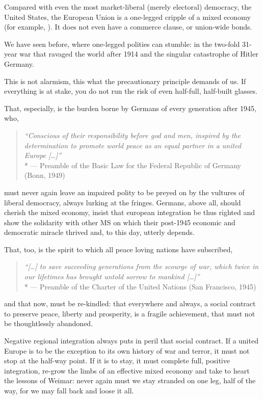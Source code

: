 Compared with even the most market-liberal (merely electoral) democracy, the United States, the European Union is a one-legged cripple of a mixed economy (for example, \citealt{Bordo2011}).
It does not even have a commerce clause, or union-wide bonds.

We have seen before, where one-legged polities can stumble:
in the two-fold 31-year war that ravaged the world after 1914 and the singular catastrophe of Hitler Germany.

This is not alarmism, this what the precautionary principle demands of us.
If everything is at stake, you do not run the risk of even half-full, half-built glasses.

That, especially, is the burden borne by Germans of every generation after 1945, who,
\begin{quote}
	\emph{``Conscious of their responsibility before god and men, inspired by the determination to promote world peace as an equal partner in a united Europe [\ldots]''}
	\\*
	--- Preamble of the Basic Law for the Federal Republic of Germany (Bonn, 1949)
\end{quote}
must never again leave an impaired polity to be preyed on by the vultures of liberal democracy, always lurking at the fringes.
Germans, above all, should cherish the mixed economy, insist that european integration be thus righted and show the solidarity with other \gls{MS} on which their post-1945 economic and democratic miracle thrived and, to this day, utterly depends.

That, too, is the spirit to which all peace loving nations have subscribed,
\begin{quote}
	\emph{``[\ldots] to save succeeding generations from the scourge of war, which twice in our lifetimes has brought untold sorrow to mankind [\ldots]''}
	\\*
	--- Preamble of the Charter of the United Nations (San Francisco, 1945)
\end{quote}
and that now, must be re-kindled:
that everywhere and always, a social contract to preserve peace, liberty and prosperity, is a fragile achievement, that must not be thoughtlessly abandoned.

Negative regional integration always puts in peril that social contract.
If a united Europe is to be the exception to its own history of war and terror, it must not stop at the half-way point.
If it is to stay, it must complete full, positive integration, re-grow the limbs of an effective mixed economy and take to heart the lessons of Weimar:
never again must we stay stranded on one leg, half of the way, for we may fall back and loose it all.

